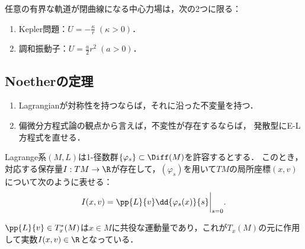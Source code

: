 \documentclass[uplatex,dvipdfmx]{jsreport}
\begin{document}
\begin{example}
    
\end{example}

\begin{problem}
    任意の有界な軌道が閉曲線になる中心力場は，次の2つに限る：
    \begin{enumerate}
        \item Kepler問題：$U=-\frac{\kappa}{r}\;(\kappa>0)$．
        \item 調和振動子：$U=\frac{a}{2}r^2\;(a>0)$．
    \end{enumerate}
\end{problem}

\subsection{Noetherの定理}

\begin{tcolorbox}[colframe=ForestGreen, colback=ForestGreen!10!white,breakable,colbacktitle=ForestGreen!40!white,coltitle=black,fonttitle=\bfseries\sffamily,
    title=]
    \begin{enumerate}
        \item Lagrangianが対称性を持つならば，それに沿った不変量を持つ．
        \item 偏微分方程式論の観点から言えば，不変性が存在するならば，
        発散型にE-L方程式を直せる．
    \end{enumerate}
\end{tcolorbox}

\begin{theorem}
    Lagrange系$(M,L)$は1-径数群$\{\varphi_s\}\subset\Diff(M)$を許容するとする．
    このとき，対応する保存量$I:TM\to\R$が存在して，$(\varphi_s)$を用いて$TM$の局所座標$(x,v)$について次のように表せる：
    \[I(x,v)=\pp{L}{v}\dd{\varphi_s(x)}{s}\biggr|_{s=0}.\]
\end{theorem}
\begin{remarks}
    $\pp{L}{v}\in T^*_x(M)$は$x\in M$に共役な運動量であり，これが$T_x(M)$の元に作用して実数$I(x,v)\in\R$となっている．
\end{remarks}
\end{document}

